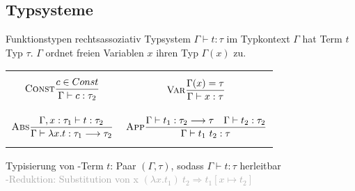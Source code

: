 \documentclass{Zusammenfassung}
\newcommand{\typeRule}[3]{ \textrm{\textsc{#1}}\frac{#2}{#3}}
\begin{document}
\subsection{Typsysteme}
Funktionstypen rechtsassoziativ
Typsystem $\Gamma\vdash t:\tau$ im Typkontext $\Gamma$ hat Term $t$ Typ $\tau$. $\Gamma$ ordnet freien Variablen $x$ ihren Typ $\Gamma(x)$ zu.
\begin{table}[H]
    \centering
    \begin{tabularx}{\textwidth}{XX}
        \begin{equation*}\typeRule{Const}{c \in Const}{\Gamma\vdash{}c:\tau_2}\end{equation*}&\begin{equation*}\typeRule{Var}{\Gamma(x)= \tau}{\Gamma\vdash{}x:\tau}\end{equation*}\\
        \begin{equation*}\typeRule{Abs}{\Gamma,x:\tau_1\vdash{}t:\tau_2}{\Gamma\vdash\lambda{}x.t:\tau_1\longrightarrow\tau_2}\end{equation*}&\begin{equation*}\typeRule{App}{\Gamma\vdash{}t_1:\tau_2\longrightarrow\tau\quad\Gamma\vdash{}t_2:\tau_2}{\Gamma\vdash{}t_1\ t_2:\tau}\end{equation*}\\
        \end{tabularx}\label{tab:table6}
\end{table}
Typisierung von \textlambda{}-Term $t$: Paar $(\Gamma,\tau)$, sodass $\Gamma\vdash{}t:\tau$ herleitbar\\
\textcolor{darkgray}{\textbeta-Reduktion: Substitution von x $(\lambda{}x.t_1)\ t_2 \Rightarrow t_1[x\mapsto t_2]$}
\end{document}
